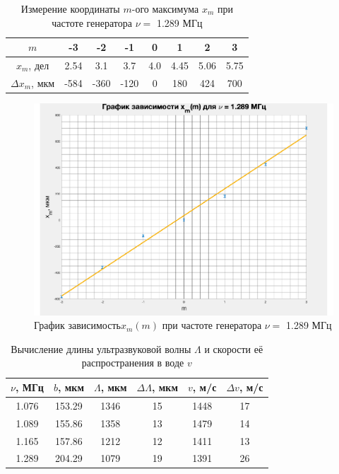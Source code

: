 \documentclass[a4paper,12pt]{article}
\begin{document}
\begin{table}[bhtp!]
	\centering
	
	\begin{tabular}{|c|c|c|c|c|c|c|c|}
		\hline
		$m$&-3&-2&-1&0&1&2&3\\
		\hline
		$x_m$, дел&2.54&3.1&3.7&4.0&4.45&5.06&5.75\\
		\hline
		$\Delta x_m$, мкм&-584&-360&-120&0&180&424&700\\
		\hline
	\end{tabular}
	
	\caption{Измерение координаты $ m $-ого максимума $ x_m $ при частоте генератора $ \nu = $ 1.289 МГц}
	\label{tab:4}
\end{table}	
	
\begin{figure}[bhtp!]
	\centering
	\includegraphics[width=0.63\linewidth]{gr4.pdf}
	\caption{График зависимость$  x_m(m) $ при частоте генератора $ \nu = $ 1.289 МГц}
	\label{gr4}
\end{figure}
	
\begin{table}[bhtp!]
	\centering
	
	\begin{tabular}{|c|c|c|c|c|c|}
		\hline
		$\nu$, МГц& $b$, мкм& $\Lambda$, мкм&$\Delta \Lambda$, мкм&$v$, м/с&$\Delta v$, м/с \\ \hline
		1.076 & 153.29 & 1346 & 15  & 1448 & 17  \\ \hline
		1.089 & 155.86 & 1358 & 13  & 1479 & 14  \\ \hline
		1.165 & 157.86 & 1212 & 12  & 1411 & 13  \\ \hline
		1.289 & 204.29 & 1079 & 19  & 1391 & 26  \\ \hline
	\end{tabular}
	
	\caption{Вычисление длины ультразвуковой волны $ \Lambda $ и скорости её распространения в воде $v$}
	\label{tab:5}
\end{table}	
	
\end{document}
